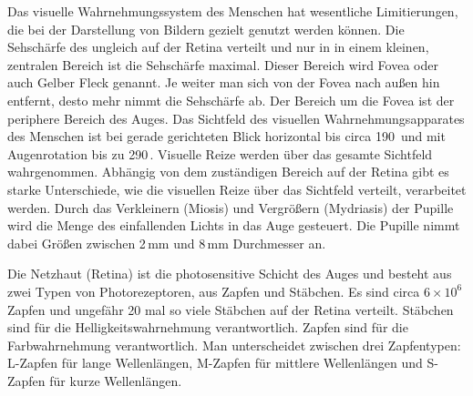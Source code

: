 Das visuelle Wahrnehmungssystem des Menschen hat wesentliche Limitierungen, die bei der Darstellung von Bildern gezielt genutzt werden können.
Die Sehschärfe des ungleich auf der Retina verteilt und nur in in einem kleinen, zentralen Bereich ist die Sehschärfe maximal.
Dieser Bereich wird Fovea oder auch Gelber Fleck genannt.
Je weiter man sich von der Fovea nach außen hin entfernt, desto mehr nimmt die Sehschärfe ab.
Der Bereich um die Fovea ist der periphere Bereich des Auges.
Das Sichtfeld des visuellen Wahrnehmungsapparates des Menschen ist bei gerade gerichteten Blick horizontal bis circa 190\,\textdegree{} und mit Augenrotation bis zu 290\,\textdegree{}.
Visuelle Reize werden über das gesamte Sichtfeld wahrgenommen.
Abhängig von dem zuständigen Bereich auf der Retina gibt es starke Unterschiede, wie die visuellen Reize über das Sichtfeld verteilt, verarbeitet werden.
Durch das Verkleinern (Miosis) und Vergrößern (Mydriasis) der Pupille wird die Menge des einfallenden Lichts in das Auge gesteuert.
Die Pupille nimmt dabei Größen zwischen 2\,mm und 8\,mm Durchmesser an.

Die Netzhaut (Retina) ist die photosensitive Schicht des Auges und besteht aus zwei Typen von Photorezeptoren, aus Zapfen und Stäbchen.
Es sind circa $6\times10^6$ Zapfen und ungefähr 20 mal so viele Stäbchen auf der Retina verteilt.
Stäbchen sind für die Helligkeitswahrnehmung verantwortlich.
Zapfen sind für die Farbwahrnehmung verantwortlich.
Man unterscheidet zwischen drei Zapfentypen: L-Zapfen für lange Wellenlängen, M-Zapfen für mittlere Wellenlängen und S-Zapfen für kurze Wellenlängen.


